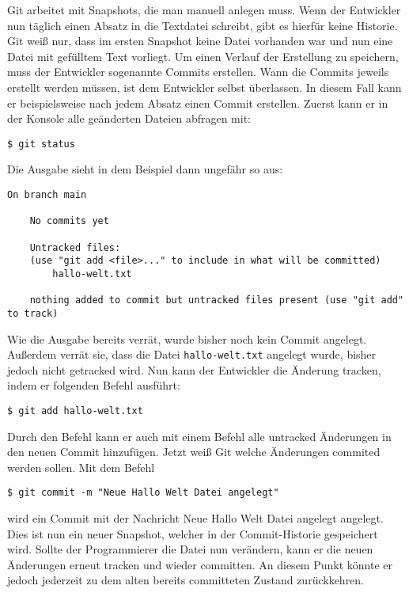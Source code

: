 Git arbeitet mit Snapshots, die man manuell anlegen muss. Wenn der Entwickler
nun täglich einen Absatz in die Textdatei schreibt, gibt es hierfür keine
Historie. Git weiß nur, dass im ersten Snapshot keine Datei vorhanden war und
nun eine Datei mit gefülltem Text vorliegt. Um einen Verlauf der Erstellung
zu speichern, muss der Entwickler sogenannte Commits erstellen. Wann die Commits
jeweils erstellt werden müssen, ist dem Entwickler selbst überlassen. In diesem
Fall kann er beispielsweise nach jedem Absatz einen Commit erstellen. Zuerst
kann er in der Konsole alle geänderten Dateien abfragen mit:

\begin{lstlisting}[style=Bash]
    $ git status
\end{lstlisting}

Die Ausgabe sieht in dem Beispiel dann ungefähr so aus:

\begin{lstlisting}[style=Bash]
    On branch main

    No commits yet

    Untracked files:
    (use "git add <file>..." to include in what will be committed)
        hallo-welt.txt

    nothing added to commit but untracked files present (use "git add" to track)
\end{lstlisting}

\newpage
Wie die Ausgabe bereits verrät, wurde bisher noch kein Commit angelegt. Außerdem
verrät sie, dass die Datei \texttt{hallo-welt.txt} angelegt wurde, bisher jedoch
nicht getracked wird. Nun kann der Entwickler die Änderung tracken, indem er
folgenden Befehl ausführt:

\begin{lstlisting}[style=Bash]
    $ git add hallo-welt.txt
\end{lstlisting}

Durch den Befehl  kann er auch mit einem Befehl alle
\glqq untracked\grqq{} Änderungen in den neuen Commit hinzufügen. Jetzt weiß
Git welche Änderungen commited werden sollen. Mit dem Befehl

\begin{lstlisting}[style=Bash]
    $ git commit -m "Neue Hallo Welt Datei angelegt"
\end{lstlisting}

wird ein Commit mit der Nachricht \glqq Neue Hallo Welt Datei angelegt\grqq{}
angelegt. Dies ist nun ein neuer Snapshot, welcher in der Commit-Historie
gespeichert wird. Sollte der Programmierer die Datei nun verändern, kann er die
neuen Änderungen erneut tracken und wieder committen. An diesem Punkt könnte er
jedoch jederzeit zu dem alten bereits committeten Zustand zurückkehren.

